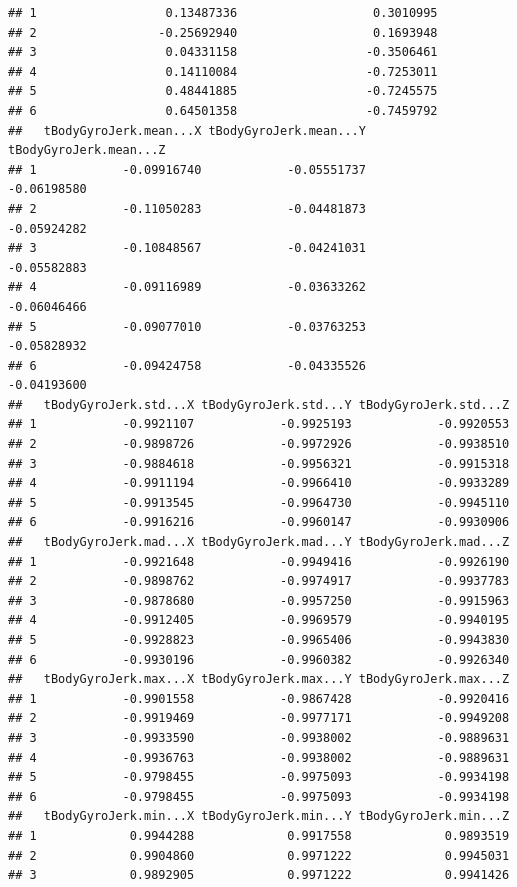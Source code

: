 \documentclass[
]{article}
\begin{document}
\begin{verbatim}
## 1                  0.13487336                   0.3010995
## 2                 -0.25692940                   0.1693948
## 3                  0.04331158                  -0.3506461
## 4                  0.14110084                  -0.7253011
## 5                  0.48441885                  -0.7245575
## 6                  0.64501358                  -0.7459792
##   tBodyGyroJerk.mean...X tBodyGyroJerk.mean...Y tBodyGyroJerk.mean...Z
## 1            -0.09916740            -0.05551737            -0.06198580
## 2            -0.11050283            -0.04481873            -0.05924282
## 3            -0.10848567            -0.04241031            -0.05582883
## 4            -0.09116989            -0.03633262            -0.06046466
## 5            -0.09077010            -0.03763253            -0.05828932
## 6            -0.09424758            -0.04335526            -0.04193600
##   tBodyGyroJerk.std...X tBodyGyroJerk.std...Y tBodyGyroJerk.std...Z
## 1            -0.9921107            -0.9925193            -0.9920553
## 2            -0.9898726            -0.9972926            -0.9938510
## 3            -0.9884618            -0.9956321            -0.9915318
## 4            -0.9911194            -0.9966410            -0.9933289
## 5            -0.9913545            -0.9964730            -0.9945110
## 6            -0.9916216            -0.9960147            -0.9930906
##   tBodyGyroJerk.mad...X tBodyGyroJerk.mad...Y tBodyGyroJerk.mad...Z
## 1            -0.9921648            -0.9949416            -0.9926190
## 2            -0.9898762            -0.9974917            -0.9937783
## 3            -0.9878680            -0.9957250            -0.9915963
## 4            -0.9912405            -0.9969579            -0.9940195
## 5            -0.9928823            -0.9965406            -0.9943830
## 6            -0.9930196            -0.9960382            -0.9926340
##   tBodyGyroJerk.max...X tBodyGyroJerk.max...Y tBodyGyroJerk.max...Z
## 1            -0.9901558            -0.9867428            -0.9920416
## 2            -0.9919469            -0.9977171            -0.9949208
## 3            -0.9933590            -0.9938002            -0.9889631
## 4            -0.9936763            -0.9938002            -0.9889631
## 5            -0.9798455            -0.9975093            -0.9934198
## 6            -0.9798455            -0.9975093            -0.9934198
##   tBodyGyroJerk.min...X tBodyGyroJerk.min...Y tBodyGyroJerk.min...Z
## 1             0.9944288             0.9917558             0.9893519
## 2             0.9904860             0.9971222             0.9945031
## 3             0.9892905             0.9971222             0.9941426

\end{verbatim}
\end{document}
